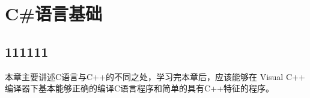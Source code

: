 ﻿%

\chapter{C\#语言基础}
\section{111111}
本章主要讲述C语言与C++的不同之处，学习完本章后，应该能够在 Visual C++
编译器下基本能够正确的编译C语言程序和简单的具有C++特征的程序。

 
